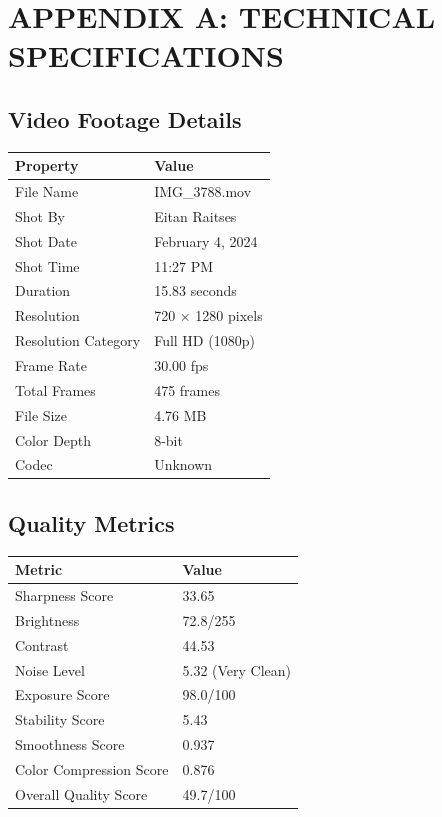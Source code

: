\documentclass[
  11pt,
]{article}
\begin{document}
\newpage

\hypertarget{appendix-a-technical-specifications}{%
\section{APPENDIX A: TECHNICAL
SPECIFICATIONS}\label{appendix-a-technical-specifications}}

\hypertarget{video-footage-details}{%
\subsection{Video Footage Details}\label{video-footage-details}}

\begin{table}[h]
\centering
\begin{tabular}{L{4.5cm}L{9.5cm}}
\toprule
\textbf{Property} & \textbf{Value} \\
\midrule
File Name & IMG\_3788.mov \\
Shot By & Eitan Raitses \\
Shot Date & February 4, 2024 \\
Shot Time & 11:27 PM \\
Duration & 15.83 seconds \\
Resolution & 720 × 1280 pixels \\
Resolution Category & Full HD (1080p) \\
Frame Rate & 30.00 fps \\
Total Frames & 475 frames \\
File Size & 4.76 MB \\
Color Depth & 8-bit \\
Codec & Unknown \\
\bottomrule
\end{tabular}
\end{table}

\hypertarget{quality-metrics}{%
\subsection{Quality Metrics}\label{quality-metrics}}

\begin{table}[h]
\centering
\begin{tabular}{L{4.5cm}L{9.5cm}}
\toprule
\textbf{Metric} & \textbf{Value} \\
\midrule
Sharpness Score & 33.65 \\
Brightness & 72.8/255 \\
Contrast & 44.53 \\
Noise Level & 5.32 (Very Clean) \\
Exposure Score & 98.0/100 \\
Stability Score & 5.43 \\
Smoothness Score & 0.937 \\
Color Compression Score & 0.876 \\
Overall Quality Score & 49.7/100 \\
\bottomrule
\end{tabular}
\end{table}
\end{document}
